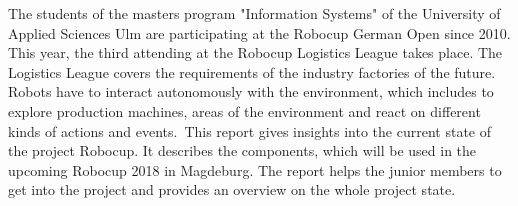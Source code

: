 The students of the masters program "Information Systems" of the University of Applied Sciences Ulm are participating at the Robocup German Open since 2010. This year, the third attending at the Robocup Logistics League takes place. The Logistics League covers the requirements of the industry factories of the future. Robots have to interact autonomously with the environment, which includes to explore production machines, areas of the environment and react on different kinds of actions and events.\
This report gives insights into the current state of the project Robocup. It describes the components, which will be used in the upcoming Robocup 2018 in Magdeburg. The report helps the junior members to get into the project and provides an overview on the whole project state.

